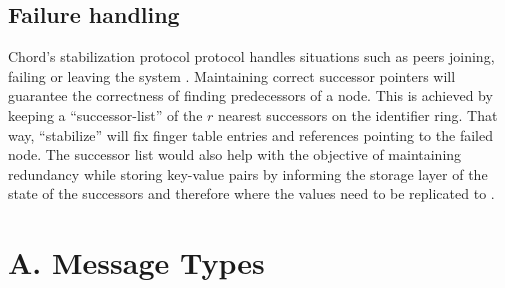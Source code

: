 \documentclass[a4paper, 11pt]{article}
\begin{document}
\subsection*{Failure handling}
Chord's stabilization protocol protocol handles situations such as peers joining, failing or leaving the system \cite{Chord}. Maintaining correct successor pointers will guarantee the correctness of finding predecessors of a node. This is achieved by keeping a ``successor-list'' of the $r$ nearest successors on the identifier ring. That way, ``stabilize'' will fix finger table entries and references pointing to the failed node. The successor list would also help with the objective of maintaining redundancy while storing key-value pairs by informing the storage layer of the state of the successors and therefore where the values need to be replicated to \cite{Chord}. 





\pagebreak

\section*{A. Message Types}

\end{document}
